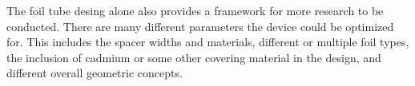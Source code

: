 The foil tube desing alone also provides a framework for more research to be conducted.
There are many different parameters the device could be optimized for.
This includes the spacer widths and materials, different or multiple foil types, the inclusion of cadmium or some other covering material in the design, and different overall geometric concepts.



